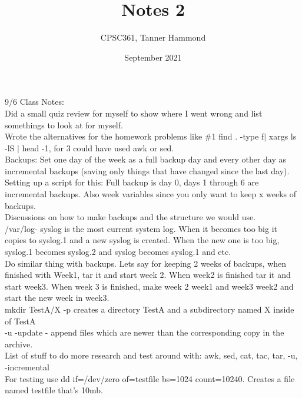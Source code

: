 \documentclass{article}
\title{Notes 2}
\author{CPSC361,
        Tanner Hammond}
\date{September 2021}
\begin{document}
\maketitle

9/6 Class Notes:\\

Did a small quiz review for myself to show where I went wrong and list somethings to look at for myself.\\

Wrote the alternatives for the homework problems like \#1 find . -type f$|$ xargs ls -lS $|$ head -1, for 3 could have used awk or sed.\\

Backups: Set one day of the week as a full backup day and every other day as incremental backups (saving only things that have changed since the last day).\\

Setting up a script for this: Full backup is day 0, days 1 through 6 are incremental backups. Also week variables since you only want to keep x weeks of backups.\\

Discussions on how to make backups and the structure we would use.\\

/var/log- syslog is the most current system log. When it becomes too big it copies to syslog.1 and a new syslog is created. When the new one is too big, syslog.1 becomes syslog.2 and syslog becomes syslog.1 and etc.\\

Do similar thing with backups. Lets say for keeping 2 weeks of backups, when finished with Week1, tar it and start week 2. When week2 is finished tar it and start week3. When week 3 is finished, make week 2 week1 and week3  week2 and start the new week in week3.\\

mkdir TestA/X -p creates a directory TestA and a subdirectory named X inside of TestA\\

-u -update - append files which are newer than the corresponding copy in the archive.\\

List of stuff to do more research and test around with: awk, sed, cat, tac, tar, -u, -incremental\\

For testing use dd if=/dev/zero of=testfile bs=1024 count=10240. Creates a file named testfile that's 10mb.\\
\end{document}
